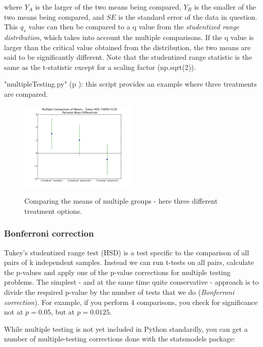 where $Y_A$ is the larger of the two means being compared, $Y_B$ is the smaller of the two means being compared, and $SE$ is the standard error of the data in question. This $q_s$ value can then be compared to a q value from the \emph{studentized range distribution}, which takes into account the multiple comparisons. If the q value is larger than the critical value obtained from the distribution, the two means are said to be significantly different.
Note that the studentized range statistic is the same as the t-statistic except for a scaling factor (np.sqrt(2)).

\PyImg "multipleTesting.py" (p \pageref{py:multipleTesting}): this script provides an example where three treatments are compared.

\begin{figure}[h]
  \centering
  \includegraphics[width=0.5\textwidth]{../Images/MultComp.png}\\
  \caption{Comparing the means of multiple groups - here three different treatment options.}
\end{figure}

\subsubsection{Bonferroni correction}

Tukey's studentized range test (HSD) is a test specific to the comparison of all pairs of k independent samples. Instead we can run t-tests on all pairs, calculate the p-values and apply one of the p-value corrections for multiple testing problems. The simplest - and at the same time quite conservative - approach is to divide the required p-value by the number of tests that we do (\emph{Bonferroni correction}). For example, if you perform 4 comparisons, you check for significance not at $p=0.05$, but at $p=0.0125$.

While multiple testing is not yet included in Python standardly, you can get a number of multiple-testing corrections done with the statsmodels package:

